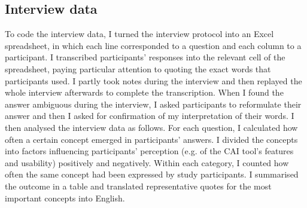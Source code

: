 \subsection{Interview data}

To code the interview data, I turned the interview protocol into an Excel spreadsheet, in which each line corresponded to a question and each column to a participant. I transcribed participants’ responses into the relevant cell of the spreadsheet, paying particular attention to quoting the exact words that participants used. I partly took notes during the interview and then replayed the whole interview afterwards to complete the transcription. When I found the answer ambiguous during the interview, I asked participants to reformulate their answer and then I asked for confirmation of my interpretation of their words. I then analysed the interview data as follows. For each question, I calculated how often a certain concept emerged in participants’ answers. I divided the concepts into factors influencing participants’ perception (e.g. of the CAI tool’s features and usability) positively and negatively. Within each category, I counted how often the same concept had been expressed by study participants. I summarised the outcome in a table and translated representative quotes for the most important concepts into English.
